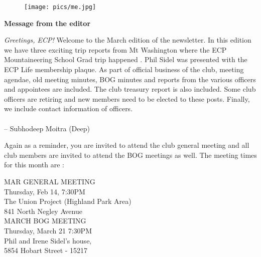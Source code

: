 \documentclass[10pt,a4paper]{article}
\newcommand{\NewsItem}[1]{%
		\usefont{T1}{augie}{m}{n} 	
		\large \bf #1 \vspace{4pt}
		\par \normalsize \normalfont}
\begin{document}
\begin{center}
\begin{minipage}[h]{0.8\linewidth}
	\begin{wrapfigure}{l}{0.41\textwidth}
		\texttt{[image: pics/me.jpg]}
		\\%
	\end{wrapfigure}
	
	\NewsItem{Message from the editor}
	\emph{Greetings, ECP!} Welcome to the March edition of the newsletter. In this edition we have three exciting trip reports from Mt Washington where the ECP Mountaineering School Grad trip happened . Phil Sidel was presented with the ECP Life membership plaque. As part of official business of the club, meeting agendae, old meeting minutes, BOG minutes and reports from the various officers and appointees are included. The club treasury report is also included. Some club officers are retiring and new members need to be elected to these posts. Finally, we include contact information of officers. 
\\
\\
-- Subhodeep Moitra (Deep)

\vspace{0.5cm}

	Again as a reminder, you are invited to attend the club general meeting and all club members are invited to attend the BOG meetings as well. The meeting times for this month are :
	
\vspace{1cm}

\begin{multicols}{2}
\Large
MAR GENERAL MEETING\\
Thursday, Feb 14, 7:30PM\\
The Union Project (Highland Park Area)\\
841 North Negley Avenue
\\
MARCH BOG MEETING\\
Thursday, March 21 7:30PM\\
Phil and Irene  Sidel's house,\\
5854 Hobart Street - 15217



\normalsize
\end{multicols}
	
\end{minipage}
\end{center}
\end{document}
